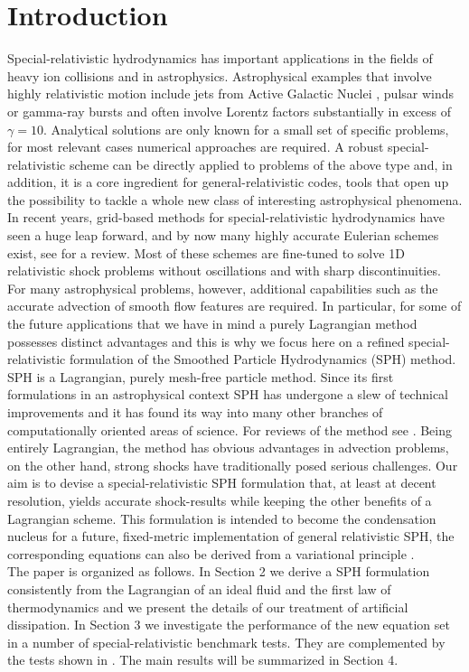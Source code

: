 \documentclass{elsart}
\begin{document}
\section{Introduction}
\label{sec_intro}
Special-relativistic hydrodynamics has important applications in the fields of heavy ion collisions
and in astrophysics. Astrophysical examples that involve highly relativistic motion include jets from 
Active Galactic Nuclei \cite{celotti01}, 
pulsar winds \cite{gallant94} or gamma-ray bursts  \cite{piran05} and often involve Lorentz factors 
substantially in excess of $\gamma= 10$. Analytical solutions are only known
for a small set of specific problems, for most relevant cases numerical approaches are required.
A robust special-relativistic scheme can be directly applied to problems of the above type and, in 
addition, it is a core ingredient for  general-relativistic codes, tools that open up the possibility 
to tackle a whole new class of interesting astrophysical phenomena.\\
In recent years, grid-based methods for special-relativistic hydrodynamics have seen a huge leap 
forward, and by now many highly accurate Eulerian schemes exist, see \cite{marti03} for a review. 
Most of these schemes are fine-tuned to solve 1D relativistic shock problems without oscillations and 
with sharp discontinuities. For many astrophysical problems, however, additional capabilities
such as the accurate advection of smooth flow features are required. In particular,
for some of the future applications that we have in mind a purely Lagrangian method possesses distinct 
advantages and this is why we focus here on a refined special-relativistic formulation of the Smoothed Particle 
Hydrodynamics (SPH) method.\\
SPH is a Lagrangian, purely mesh-free particle method.
Since its first formulations in an astrophysical context \cite{lucy77,gingold77} SPH has undergone 
a slew of technical improvements and it has  found its way into many other branches of computationally 
oriented areas of science. For reviews of the method see \cite{benz90a,monaghan92,monaghan05,rosswog09b}.
Being entirely Lagrangian, the method has obvious advantages in advection problems, on the other hand, 
strong shocks have traditionally posed serious challenges. Our aim is to devise a special-relativistic 
SPH formulation that, at least at decent resolution, yields accurate shock-results while keeping the other 
benefits of a Lagrangian scheme. This formulation is intended to become the condensation nucleus for a 
future, fixed-metric implementation of general relativistic SPH, the corresponding equations  can also be derived from a variational principle \cite{monaghan01,rosswog10a}.\\
The paper is organized as follows. In Section 2 we derive a SPH formulation consistently from
the Lagrangian of an ideal fluid and the first law of thermodynamics and we present the details of 
our treatment of artificial dissipation.
In Section 3 we investigate the performance of the new equation set in a number of 
special-relativistic benchmark tests. They are complemented by the tests shown in 
\cite{rosswog10d}. The main results will be summarized in Section 4.
\end{document}
